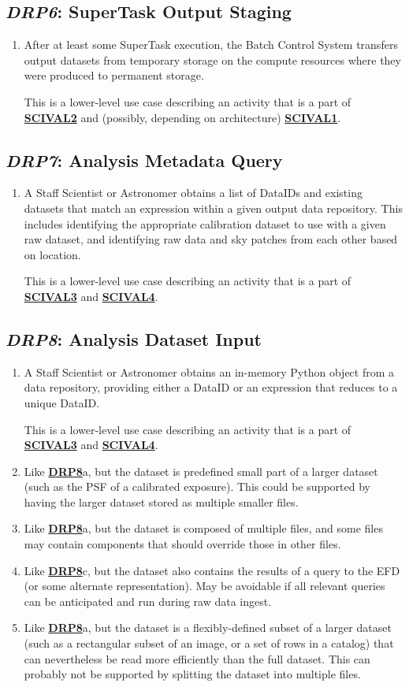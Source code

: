\documentclass[DM,toc,lsstdraft]{lsstdoc}
\newcommand{\usecase}[3]{%
\subsection{\emph{#1}: #2}
\label{use:#1}
\begin{enumerate}[label=\alph*.]
#3
\end{enumerate}
}
\newcommand{\useref}[1]{\hyperref[use:#1]{\textcolor{lsstblue}{\textbf{#1}}}}
\begin{document}
\usecase{DRP6}{SuperTask Output Staging}{%

\item
After at least some SuperTask execution, the Batch Control System transfers output datasets from temporary storage on the compute resources where they were produced to permanent storage.

This is a lower-level use case describing an activity that is a part of \useref{SCIVAL2} and (possibly, depending on architecture) \useref{SCIVAL1}.

}

\usecase{DRP7}{Analysis Metadata Query}{%

\item
A Staff Scientist or Astronomer obtains a list of DataIDs and existing datasets that match an expression within a given output data repository.
This includes identifying the appropriate calibration dataset to use with a given raw dataset, and identifying raw data and sky patches from each other based on location.

This is a lower-level use case describing an activity that is a part of \useref{SCIVAL3} and \useref{SCIVAL4}.
}

\usecase{DRP8}{Analysis Dataset Input}{%

\item
A Staff Scientist or Astronomer obtains an in-memory Python object from a data repository, providing either a DataID or an expression that reduces to a unique DataID.

This is a lower-level use case describing an activity that is a part of \useref{SCIVAL3} and \useref{SCIVAL4}.

\item
Like \useref{DRP8}a, but the dataset is predefined small part of a larger dataset (such as the PSF of a calibrated exposure).
This could be supported by having the larger dataset stored as multiple smaller files.

\item
Like \useref{DRP8}a, but the dataset is composed of multiple files, and some files may contain components that should override those in other files.

\item
Like \useref{DRP8}c, but the dataset also contains the results of a query to the EFD (or some alternate representation).
May be avoidable if all relevant queries can be anticipated and run during raw data ingest.

\item
Like \useref{DRP8}a, but the dataset is a flexibly-defined subset of a larger dataset (such as a rectangular subset of an image, or a set of rows in a catalog) that can nevertheless be read more efficiently than the full dataset.
This can probably not be supported by splitting the dataset into multiple files.
}
\end{document}
